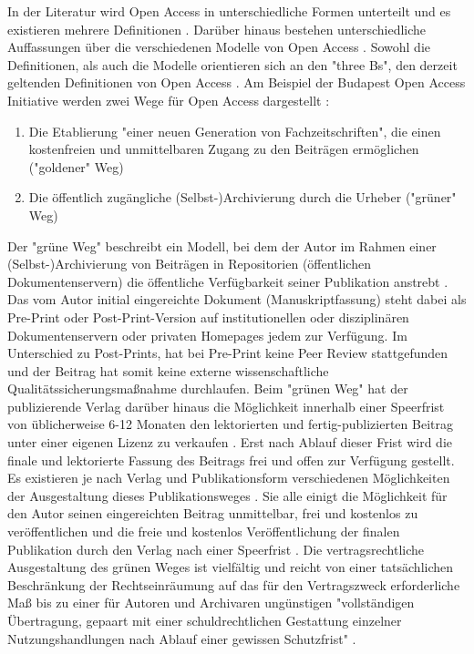 In der Literatur wird Open Access in unterschiedliche Formen unterteilt und es existieren mehrere Definitionen \cite{CREATe_2014} \cite{albert_2006_open_implications}. Darüber hinaus bestehen unterschiedliche Auffassungen über die verschiedenen Modelle von Open Access \cite{CREATe_2014} \cite{cite:22b} \cite{lewis_2012_inevitability}. Sowohl die Definitionen, als auch die Modelle orientieren sich an den "three Bs", den derzeit geltenden Definitionen von Open Access \cite{Adema_2014_open_access}. Am Beispiel der Budapest Open Access Initiative werden zwei Wege für Open Access dargestellt \cite{albert_2006_open_implications}:
\begin{enumerate}
\item Die Etablierung "einer neuen Generation von Fachzeitschriften", die einen kostenfreien und unmittelbaren Zugang zu den Beiträgen ermöglichen ("goldener" Weg)
\item Die öffentlich zugängliche (Selbst-)Archivierung durch die Urheber ("grüner" Weg)
\end{enumerate}

Der "grüne Weg" beschreibt ein Modell, bei dem der Autor im Rahmen einer (Selbst-)Archivierung von Beiträgen in Repositorien (öffentlichen Dokumentenservern) die öffentliche Verfügbarkeit seiner Publikation anstrebt \cite{muller_2010_open}. Das vom Autor initial eingereichte Dokument (Manuskriptfassung) steht dabei als Pre-Print oder Post-Print-Version auf institutionellen oder disziplinären Dokumentenservern \cite{suchen} oder privaten Homepages \cite{suchen} jedem zur Verfügung. Im Unterschied zu Post-Prints, hat bei Pre-Print keine Peer Review stattgefunden \cite{suchen} und der Beitrag hat somit keine externe wissenschaftliche Qualitätssicherungsmaßnahme durchlaufen. Beim "grünen Weg" hat der publizierende Verlag darüber hinaus die Möglichkeit innerhalb einer Speerfrist von üblicherweise 6-12 Monaten \cite{suchen} den lektorierten und fertig-publizierten Beitrag unter einer eigenen Lizenz zu verkaufen \cite{suchen}. Erst nach Ablauf dieser Frist wird die finale und lektorierte Fassung des Beitrags frei und offen zur Verfügung gestellt. Es existieren je nach Verlag und Publikationsform verschiedenen Möglichkeiten der Ausgestaltung dieses Publikationsweges \cite{suchen}. Sie alle einigt die Möglichkeit für den Autor seinen eingereichten Beitrag unmittelbar, frei und kostenlos zu veröffentlichen und die freie und kostenlos Veröffentlichung der finalen Publikation durch den Verlag nach einer Speerfrist \cite{dorschel_2006_open}. Die vertragsrechtliche Ausgestaltung des grünen Weges ist vielfältig und reicht von einer tatsächlichen Beschränkung der Rechtseinräumung auf das für den Vertragszweck erforderliche Maß bis zu einer für Autoren und Archivaren ungünstigen "vollständigen Übertragung, gepaart mit einer schuldrechtlichen Gestattung einzelner Nutzungshandlungen nach Ablauf einer gewissen Schutzfrist" \cite{dorschel_2006_open}.


